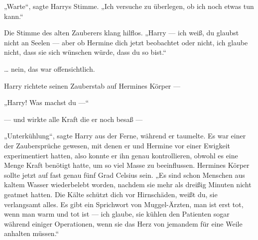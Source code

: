 „Warte“, sagte Harrys Stimme.
„Ich versuche zu überlegen, ob ich noch etwas tun kann.“

Die Stimme des alten Zauberers klang hilflos.
„Harry — ich weiß, du glaubst nicht an Seelen — aber ob Hermine dich jetzt beobachtet oder nicht, ich glaube nicht, dass sie sich wünschen würde, dass du so bist.“

… nein, das war offensichtlich.

Harry richtete seinen Zauberstab auf Hermines Körper —

„Harry! Was machst du —“

— und wirkte alle Kraft die er noch besaß —



„Unterkühlung“, sagte Harry aus der Ferne, während er taumelte. Es war einer der Zaubersprüche gewesen, mit denen er und Hermine vor einer Ewigkeit experimentiert hatten, also konnte er ihn genau kontrollieren, obwohl es eine Menge Kraft benötigt hatte, um so viel Masse zu beeinflussen. Hermines Körper sollte jetzt auf fast genau fünf Grad Celsius sein.
„Es sind schon Menschen aus kaltem Wasser wiederbelebt worden, nachdem sie mehr als dreißig Minuten nicht geatmet hatten. Die Kälte schützt dich vor Hirnschäden, weißt du, sie verlangsamt alles. Es gibt ein Sprichwort von Muggel-Ärzten, man ist erst tot, wenn man warm und tot ist — ich glaube, sie kühlen den Patienten sogar während einiger Operationen, wenn sie das Herz von jemandem für eine Weile anhalten müssen.“

